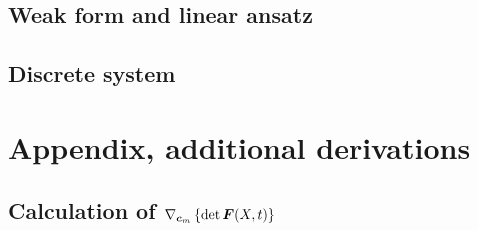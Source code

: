 \documentclass[a4paper,11pt]{article}
\begin{document}
\subsection{Weak form and linear ansatz}


\subsection{Discrete system}


\newpage
\section{Appendix, additional derivations}

\subsection{Calculation of $\nabla_{\boldsymbol{c}_m}\left\{\det \boldsymbol{F}(X,t)\right\}$}




\end{document}
